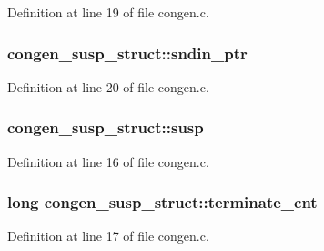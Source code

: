 Definition at line 19 of file congen.\+c.

\subsubsection[{\texorpdfstring{sndin\+\_\+ptr}{sndin_ptr}}]{ congen\+\_\+susp\+\_\+struct\+::sndin\+\_\+ptr}\hypertarget{structcongen__susp__struct_a8dc2980de5478154eee6e74e2af624a4}{}\label{structcongen__susp__struct_a8dc2980de5478154eee6e74e2af624a4}


Definition at line 20 of file congen.\+c.

\subsubsection[{\texorpdfstring{susp}{susp}}]{ congen\+\_\+susp\+\_\+struct\+::susp}\hypertarget{structcongen__susp__struct_a7e68a3f2f7cfc04521c251e8aa63b473}{}\label{structcongen__susp__struct_a7e68a3f2f7cfc04521c251e8aa63b473}


Definition at line 16 of file congen.\+c.

\subsubsection[{\texorpdfstring{terminate\+\_\+cnt}{terminate_cnt}}]{\setlength{\rightskip}{0pt plus 5cm}long congen\+\_\+susp\+\_\+struct\+::terminate\+\_\+cnt}\hypertarget{structcongen__susp__struct_a2befa070198694684a16cc5afec63709}{}\label{structcongen__susp__struct_a2befa070198694684a16cc5afec63709}


Definition at line 17 of file congen.\+c.

